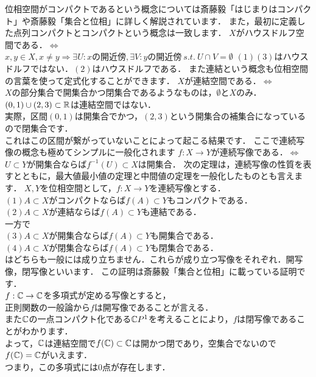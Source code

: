 位相空間がコンパクトであるという概念については斎藤毅「はじまりはコンパクト」や斎藤毅「集合と位相」に詳しく解説されています．
また，最初に定義した点列コンパクトとコンパクトという概念は一致します．
$X$がハウスドルフ空間である．$\iff$\\
$x,y \in X , x\neq y \Rightarrow \exists U:x\mbox{の開近傍} ,\exists V:y\mbox{の開近傍} \ s.t. \ U \cap V = \emptyset$
\ex
$(1)(3)$はハウスドルフではない．$(2)$はハウスドルフである．
\exx
また連結という概念も位相空間の言葉を使って定式化することができます．
$X$が連結空間である．$\iff$\\
$X$の部分集合で開集合かつ閉集合であるようなものは，$\emptyset$と$X$のみ．
\ex
$(0,1) \cup (2,3)\subset\mathbb R$は連結空間ではない．\\
実際，区間$(0,1)$は開集合でかつ，$(2,3)$という開集合の補集合になっているので閉集合です．\\
これはこの区間が繋がっていないことによって起こる結果です．
\exx
ここで連続写像の概念も極めてシンプルに一般化されます
$f:X\to Y$が連続写像である．$\iff$\\
$U \subset Y$が開集合ならば$f^{-1}(U) \subset X$は開集合．
次の定理は，連続写像の性質を表すとともに，最大値最小値の定理と中間値の定理を一般化したものとも言えます．
\thm
$X,Y$を位相空間として，$f:X\to Y$を連続写像とする．\\
$(1)$$A\subset X$がコンパクトならば$f(A)\subset Y$もコンパクトである．\\
$(2)$$A\subset X$が連結ならば$f(A)\subset Y$も連結である．\\
\thmx
\rem
一方で\\
$(3)A\subset X$が開集合ならば$f(A)\subset Y$も開集合である．\\
$(4)A\subset X$が閉集合ならば$f(A)\subset Y$も閉集合である．\\
はどちらも一般には成り立ちません．これらが成り立つ写像をそれぞれ．開写像，閉写像といいます．
\remx
\proof[位相空間論における代数学の基本定理の証明]
この証明は斎藤毅「集合と位相」に載っている証明です．\\
$f:\mathbb C \to \mathbb C$を多項式が定める写像とすると，\\
正則関数の一般論から$f$は開写像であることが言える．\\
また$\mathbb C$の一点コンパクト化である$\mathbb C P^1$を考えることにより，$f$は閉写像であることがわかります．\\
よって，$\mathbb C$は連結空間で$f(\mathbb C)\subset\mathbb C$は開かつ閉であり，空集合でないので$f(\mathbb C)=\mathbb C$がいえます．\\
つまり，この多項式には$0$点が存在します．
